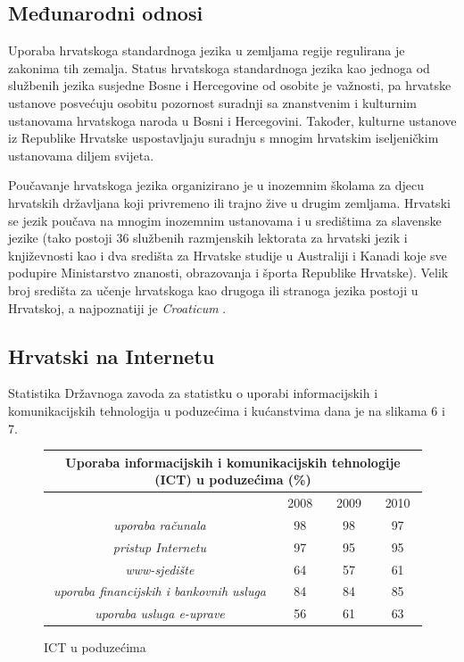 \begin{multicols}{2}
\subsection{Međunarodni odnosi}

Uporaba hrvatskoga standardnoga jezika u zemljama regije regulirana je zakonima tih zemalja. Status hrvatskoga standardnoga jezika kao jednoga od službenih jezika susjedne Bosne i Hercegovine od osobite je važnosti, pa hrvatske ustanove posvećuju osobitu pozornost suradnji sa znanstvenim i kulturnim ustanovama hrvatskoga naroda u Bosni i Hercegovini. Također, kulturne ustanove iz Republike Hrvatske uspostavljaju suradnju s mnogim hrvatskim iseljeničkim ustanovama diljem svijeta.


Poučavanje hrvatskoga jezika organizirano je u inozemnim školama za djecu hrvatskih državljana koji privremeno ili trajno žive u drugim zemljama. Hrvatski se jezik poučava na mnogim inozemnim ustanovama i u središtima za slavenske jezike (tako postoji 36 službenih razmjenskih lektorata za hrvatski jezik i književnosti kao i dva središta za Hrvatske studije u Australiji i Kanadi koje sve podupire Ministarstvo znanosti, obrazovanja i športa Republike Hrvatske). Velik broj središta za učenje hrvatskoga kao drugoga ili stranoga jezika postoji u Hrvatskoj, a najpoznatiji je \emph{Croaticum} \cite{str10}.

\subsection{Hrvatski na Internetu}

Statistika Državnoga zavoda za statistku o uporabi informacijskih i komunikacijskih tehnologija u poduzećima i kućanstvima dana je na slikama 6 i 7.

\begin{figure}[htb]
\centering
    \begin{tabular}{|c|c|c|c|}
        \hline
      \multicolumn{4}{|c|}{\textbf{Uporaba informacijskih i komunikacijskih tehnologije (ICT) u poduzećima (\%)}} \\ \hline
        ~                                              & 2008 & 2009 & 2010 \\ \hline
        \emph{uporaba računala}                        & 98   & 98   & 97   \\ \hline
        \emph{pristup Internetu}                       & 97   & 95   & 95   \\ \hline
        \emph{www-sjedište}                            & 64   & 57   & 61   \\ \hline
        \emph{uporaba financijskih i bankovnih usluga} & 84   & 84   & 85   \\ \hline
        \emph{uporaba usluga e-uprave}                 & 56   & 61   & 63   \\
        \hline
   \end{tabular}
  \caption{ICT u poduzećima}
  \label{fig:IST_pod}
\end{figure}


\end{multicols}
